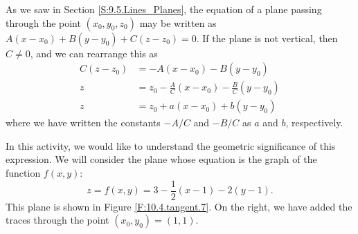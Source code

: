\begin{pa} \label{PA:10.4} 
  As we saw in Section \ref{S:9.5.Lines_Planes}, the equation
  of a plane passing through the point $(x_0, y_0, z_0)$ may be written
  as $A(x-x_0) + B(y-y_0) + C(z-z_0) = 0$.  If the
  plane is not vertical, then $C\neq 0$, and we can
  rearrange this as
  \begin{align*}
    C(z-z_0) & = -A(x-x_0) - B(y-y_0) \\
    z & = z_0-\frac AC(x-x_0) - \frac BC(y-y_0) \\
    z & = z_0 + a(x-x_0) + b(y-y_0)
  \end{align*}
  where we have written the constants $-A/C$ and $-B/C$ as $a$ and
  $b$, respectively.
  
  In this activity, we would like to understand the geometric
  significance of this expression.  We will consider the plane whose
  equation is the graph of the function $f(x,y)$:
  $$
  z = f(x,y) = 3 - \frac12(x-1) - 2(y-1).
  $$
  This plane is shown in Figure \ref{F:10.4.tangent.7}.  On the right,
  we have added the traces through the point $(x_0,y_0) = (1,1)$.
  

\end{pa}
